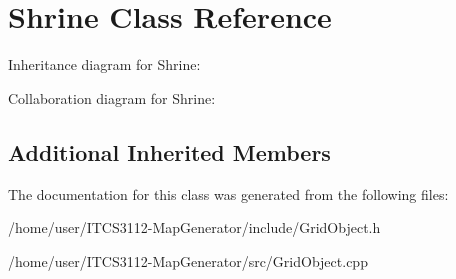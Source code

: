 \hypertarget{classShrine}{}\section{Shrine Class Reference}
\label{classShrine}


Inheritance diagram for Shrine\+:


Collaboration diagram for Shrine\+:
\subsection*{Additional Inherited Members}


The documentation for this class was generated from the following files\+:\begin{DoxyCompactItemize}
\item 
/home/user/\+I\+T\+C\+S3112-\/\+Map\+Generator/include/Grid\+Object.\+h\item 
/home/user/\+I\+T\+C\+S3112-\/\+Map\+Generator/src/Grid\+Object.\+cpp\end{DoxyCompactItemize}
